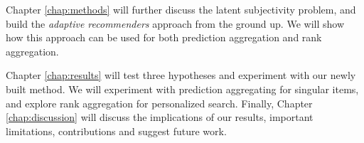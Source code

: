 Chapter \ref{chap:methods} will further discuss the latent subjectivity problem,
and build the \emph{adaptive recommenders} approach from the ground up.
We will show how this approach can be used for both prediction aggregation
and rank aggregation.

Chapter \ref{chap:results} will test three hypotheses and experiment with our newly built method.
We will experiment with prediction aggregating for singular items, and explore rank aggregation for personalized search.
Finally, Chapter \ref{chap:discussion} will discuss the implications of our results,
important limitations, contributions and suggest future work.

